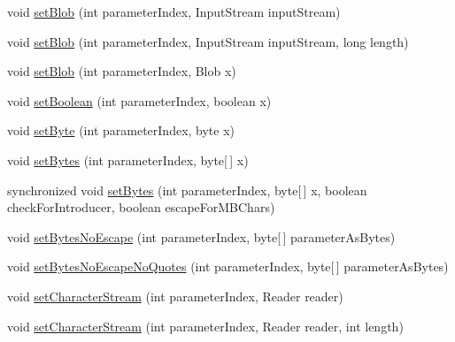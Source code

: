 \begin{DoxyCompactItemize}
\item 
void \mbox{\hyperlink{classcom_1_1mysql_1_1cj_1_1_client_prepared_query_bindings_a961304e6866754fddaf90d96d016d2b7}{set\+Blob}} (int parameter\+Index, Input\+Stream input\+Stream)
\item 
void \mbox{\hyperlink{classcom_1_1mysql_1_1cj_1_1_client_prepared_query_bindings_a78a25af01fb5a0c2ad75ed1ab989bd79}{set\+Blob}} (int parameter\+Index, Input\+Stream input\+Stream, long length)
\item 
void \mbox{\hyperlink{classcom_1_1mysql_1_1cj_1_1_client_prepared_query_bindings_adcca0847867034b36b1a693c42240ec6}{set\+Blob}} (int parameter\+Index, Blob x)
\item 
void \mbox{\hyperlink{classcom_1_1mysql_1_1cj_1_1_client_prepared_query_bindings_a95306bbca0acad61273aab0c7468ecfa}{set\+Boolean}} (int parameter\+Index, boolean x)
\item 
void \mbox{\hyperlink{classcom_1_1mysql_1_1cj_1_1_client_prepared_query_bindings_a1410021de9d65ccf267c055166ad1b16}{set\+Byte}} (int parameter\+Index, byte x)
\item 
void \mbox{\hyperlink{classcom_1_1mysql_1_1cj_1_1_client_prepared_query_bindings_ac055efd4d2a296c92fa5b262965af6ac}{set\+Bytes}} (int parameter\+Index, byte\mbox{[}$\,$\mbox{]} x)
\item 
synchronized void \mbox{\hyperlink{classcom_1_1mysql_1_1cj_1_1_client_prepared_query_bindings_af7dc14bb72423ebe29bff74817f3b011}{set\+Bytes}} (int parameter\+Index, byte\mbox{[}$\,$\mbox{]} x, boolean check\+For\+Introducer, boolean escape\+For\+M\+B\+Chars)
\item 
void \mbox{\hyperlink{classcom_1_1mysql_1_1cj_1_1_client_prepared_query_bindings_a2a1630dfc22ebabff166c2efa046fa28}{set\+Bytes\+No\+Escape}} (int parameter\+Index, byte\mbox{[}$\,$\mbox{]} parameter\+As\+Bytes)
\item 
void \mbox{\hyperlink{classcom_1_1mysql_1_1cj_1_1_client_prepared_query_bindings_a8abd01905c6ec12e0d41c7e4d3dab57c}{set\+Bytes\+No\+Escape\+No\+Quotes}} (int parameter\+Index, byte\mbox{[}$\,$\mbox{]} parameter\+As\+Bytes)
\item 
void \mbox{\hyperlink{classcom_1_1mysql_1_1cj_1_1_client_prepared_query_bindings_ab3c84f3033d28fe1c03cd463079935dc}{set\+Character\+Stream}} (int parameter\+Index, Reader reader)
\item 
void \mbox{\hyperlink{classcom_1_1mysql_1_1cj_1_1_client_prepared_query_bindings_ac095e4d977342243421475f9fc0d52b6}{set\+Character\+Stream}} (int parameter\+Index, Reader reader, int length)

\end{DoxyCompactItemize}
